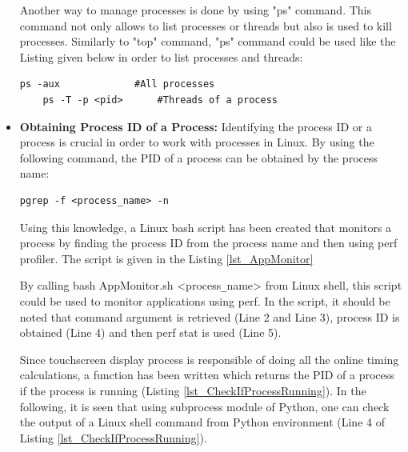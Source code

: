 \begin{itemize}
	Another way to manage processes is done by using "ps" command. This command not only allows to list processes or threads but also is used to kill processes. Similarly to "top" command, "ps" command could be used like the Listing given below in order to list processes and threads:
	\begin{lstlisting}[style=bash]
	ps -aux             #All processes
	ps -T -p <pid>      #Threads of a process
	\end{lstlisting}
	
	\item \textbf{Obtaining Process ID of a Process:} Identifying the process ID or a process is crucial in order to work with processes in Linux. By using the following command, the PID of a process can be obtained by the process name:
	\begin{lstlisting}[style=bash]
		pgrep -f <process_name> -n 
	\end{lstlisting}
	Using this knowledge, a Linux bash script has been created that monitors a process by finding the process ID from the process name and then using perf profiler. The script is given in the Listing \ref{lst_AppMonitor}
	
	
	By calling bash AppMonitor.sh <process\texttt{\_}name> from Linux shell, this script could be used to monitor applications using perf. In the script, it should be noted that command argument is retrieved (Line 2 and Line 3), process ID is obtained (Line 4) and then perf stat is used (Line 5). 
	
	
	Since touchscreen display process is responsible of doing all the online timing calculations, a function has been written which returns the PID of a process if the process is running (Listing \ref{lst_CheckIfProcessRunning}). In the following, it is seen that using subprocess module of Python, one can check the output of a Linux shell command from Python environment (Line 4 of Listing \ref{lst_CheckIfProcessRunning}).
	

\end{itemize}
